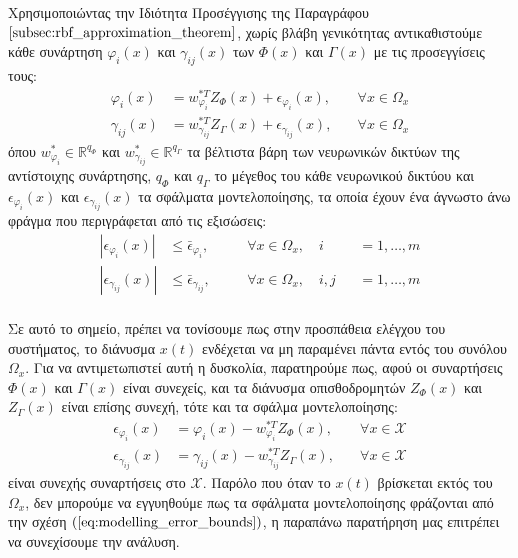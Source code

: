 Χρησιμοποιώντας την Ιδιότητα Προσέγγισης της Παραγράφου $\ref{subsec:rbf_approximation_theorem}$, χωρίς βλάβη γενικότητας αντικαθιστούμε κάθε  συνάρτηση $\varphi_i(x)$ και $\gamma_{ij}(x)$ των $\varPhi(x)$ και $\Gamma(x)$ με τις προσεγγίσεις τους:
\begin{equation}
\begin{alignedat}{2}
	\varphi_i(x) &= w_{\varphi_i}^{*T} Z_{\varPhi}(x) + \epsilon_{\varphi_i}(x), \quad &\forall x \in \Omega_x \\
	\gamma_{ij}(x) &= w_{\gamma_{ij}}^{*T} Z_{\Gamma}(x) + \epsilon_{\gamma_{ij}}(x), \quad &\forall x \in \Omega_x
\end{alignedat}
\label{eq:rbf_approximations}
\end{equation}
όπου $w_{\varphi_i}^{*} \in \mathbb{R}^{q_{\varPhi}}$ και $w_{\gamma_{ij}}^{*} \in \mathbb{R}^{q_{\Gamma}}$ τα βέλτιστα βάρη των νευρωνικών δικτύων της αντίστοιχης συνάρτησης, $q_{\varPhi}$ και $q_{\Gamma}$ το μέγεθος του κάθε νευρωνικού δικτύου και $\epsilon_{\varphi_i}(x)$ και $\epsilon_{\gamma_{ij}}(x)$ τα σφάλματα μοντελοποίησης, τα οποία έχουν ένα άγνωστο άνω φράγμα που περιγράφεται από τις εξισώσεις:
\begin{equation}
\begin{alignedat}{3}
	| \epsilon_{\varphi_i}(x) | &\leq \bar{\epsilon}_{\varphi_i}, \quad &&\forall x \in \Omega_x, \quad  i&&= 1,\dots,m \\
	| \epsilon_{\gamma_{ij}}(x) | &\leq \bar{\epsilon}_{\gamma_{ij}}, \quad &&\forall x \in \Omega_x, \quad i,j &&= 1,\dots,m \\
	\end{alignedat}
	\label{eq:modelling_error_bounds}
\end{equation}

Σε αυτό το σημείο, πρέπει να τονίσουμε πως στην προσπάθεια ελέγχου του συστήματος, το διάνυσμα $x(t)$ ενδέχεται να μη παραμένει πάντα εντός του συνόλου $\Omega_x$. Για να αντιμετωπιστεί αυτή η δυσκολία, παρατηρούμε πως, αφού οι συναρτήσεις $\Phi(x)$ και $\Gamma(x)$ είναι συνεχείς, και τα διάνυσμα οπισθοδρομητών $Z_{\Phi}(x)$ και $Z_{\Gamma}(x)$ είναι επίσης συνεχή, τότε και τα σφάλμα μοντελοποίησης:
\begin{equation}
\begin{alignedat}{2}
\epsilon_{\varphi_i}(x) &= \varphi_i(x) - w_{\varphi_i}^{*T} Z_{\varPhi}(x) , \quad &\forall x \in \mathcal{X} \\
\epsilon_{\gamma_{ij}}(x) &= \gamma_{ij}(x) - w_{\gamma_{ij}}^{*T} Z_{\Gamma}(x) , \quad &\forall x \in \mathcal{X}
\end{alignedat}
\label{eq:modelling_error_continuity}
\end{equation}
είναι συνεχής συναρτήσεις στο $\mathcal{X}$. Παρόλο που όταν το $x(t)$ βρίσκεται εκτός του $\Omega_x$, δεν μπορούμε να εγγυηθούμε πως τα σφάλματα μοντελοποίησης φράζονται από την σχέση $(\ref{eq:modelling_error_bounds})$, η παραπάνω παρατήρηση μας επιτρέπει να συνεχίσουμε την ανάλυση.

